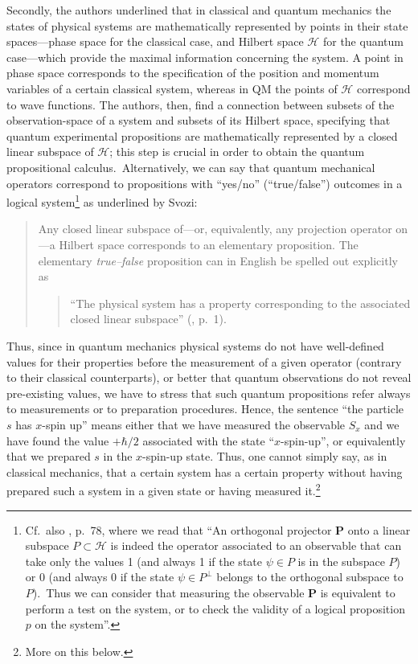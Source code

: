 \documentclass[11pt, executivepaper]{article}
\begin{document}
Secondly, the authors underlined that in classical and quantum mechanics the states of physical systems are mathematically represented by points in their state spaces---phase space for the classical case, and Hilbert space $\mathcal{H}$ for the quantum case---which provide the maximal information concerning the system. A point in phase space corresponds to the specification of the position and momentum variables of a certain classical system, whereas in QM the points of $\mathcal{H}$ correspond to wave functions. The authors, then, find a connection between subsets of the observation-space of a system and subsets of its Hilbert space, specifying that quantum experimental propositions are mathematically represented by a closed linear subspace of $\mathcal{H}$; this step is crucial in order to obtain the quantum propositional calculus.\ Alternatively, we can say that quantum mechanical operators correspond to propositions with ``yes/no'' (``true/false'') outcomes in a logical system\footnote{Cf.\ also \cite{David:2015}, p.\ 78, where we read that ``An orthogonal projector $\textbf{P}$ onto a linear subspace $P\subset\mathcal{H}$ is indeed the operator associated to an observable that can take only the values 1 (and always 1 if the state $\psi\in P$ is in the subspace $P$) or 0 (and always 0 if the state $\psi\in P^{\perp}$ belongs to the orthogonal subspace to $P$).\ Thus we can consider that measuring the observable $\textbf{P}$ is equivalent to perform a test on the system, or to check the validity of a logical proposition $p$ on the system''.} as underlined by Svozi:
\begin{quote}
Any closed linear subspace of---or, equivalently, any projection operator on---a Hilbert space corresponds to an elementary
proposition. The elementary \emph{true--false} proposition can in English be spelled out explicitly as
\begin{quote}
``The physical system has a property corresponding to the associated closed linear subspace'' (\cite{Svozi:1999}, p.\ 1).
\end{quote}
\end{quote}

Thus, since in quantum mechanics physical systems do not have well-defined values for their properties before the measurement of a given operator (contrary to their classical counterparts), or better that quantum observations do not reveal pre-existing values, we have to stress that such quantum propositions refer always to measurements or to preparation procedures. Hence, the sentence ``the particle $s$ has $x$-spin up'' means either that we have measured the observable $S_x$ and we have found the value $+\hbar/2$ associated with the state ``$x$-spin-up'', or equivalently that we prepared $s$ in the $x$-spin-up state. Thus, one cannot simply say, as in classical mechanics, that a certain system has a certain property without having prepared such a system in a given state or having measured it.\footnote{More on this below.}
\end{document}
